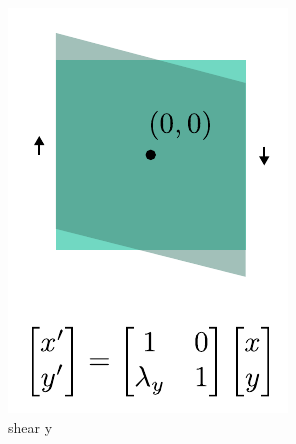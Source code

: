 \begin{figure}[t]
\begin{subfigure}[t]{0.195\linewidth}
        \includegraphics[width=\linewidth]{imgs/shear_y.pdf}
        \caption{\label{fig:shear_y} shear y}
    \end{subfigure}
    \begin{subfigure}[t]{0.195\linewidth}
        \centering

\end{subfigure}
\end{figure}
